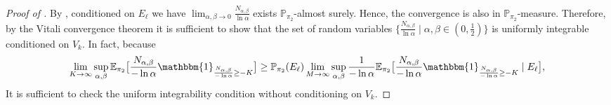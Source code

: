 \documentclass[a4paper,UKenglish,cleveref, autoref,mathscr]{lipics-v2019}
\newcommand{\EE}{\mathbb{E}}
\newcommand{\PP}{\mathbb{P}}
\newcommand{\1}{\mathbbm{1}}
\begin{document}
\begin{proof}[Proof of ]
By , conditioned on $E_\ell$ we have $\lim_{\alpha, \beta \rightarrow 0} \frac{N_{\alpha, \beta}}{\ln \alpha}$ exists $\PP_{\pi_2}$-almost surely. Hence, the convergence is also in $\PP_{\pi_2}$-measure. Therefore, by the Vitali convergence theorem\cite{bog2007} it is sufficient to show that the set of random variables $\{ \frac{N_{\alpha, \beta}}{\ln \alpha} \mid \alpha, \beta \in (0,\frac12) \}$ is uniformly integrable conditioned on $V_k$. In fact, because
\begin{equation}\label{unifintcond}
\lim_{K \rightarrow \infty} \sup_{\alpha, \beta} \EE_{\pi_2} \big[ \frac{N_{\alpha, \beta}}{- \ln \alpha}\1_{\frac{N_{\alpha, \beta}}{-\ln \alpha} \geq - K}\big] \geq \PP_{\pi_2}(E_\ell) \lim_{M \rightarrow \infty} \sup_{\alpha, \beta} \frac{1}{- \ln \alpha}\EE_{\pi_2} \big[ \frac{N_{\alpha, \beta}}{- \ln \alpha}\1_{\frac{N_{\alpha, \beta}}{-\ln \alpha} \geq - K} \mid E_\ell \big],
\end{equation}
It is sufficient to check the uniform integrability condition without conditioning on $V_k$.


\end{proof}
\end{document}
